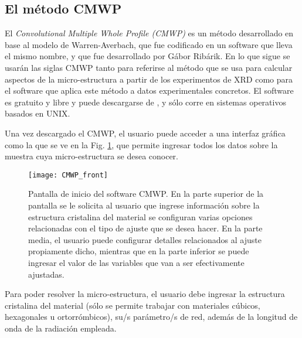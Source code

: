 \subsection{El método CMWP}\label{SS:CMWP}
El \textit{Convolutional Multiple Whole Profile (CMWP)} es un método desarrollado en base al modelo de Warren-Averbach, que fue codificado en un software que lleva el mismo nombre, y que fue desarrollado por Gábor Ribárik\cite{Ungar2001,Ribarik2001,Ribarik2008}. 
En lo que sigue se usarán las siglas CMWP tanto para referirse al método que se usa para calcular aspectos de la micro-estructura a partir de los experimentos de XRD como para el software que aplica este método a datos experimentales concretos.
El software es gratuito y libre y puede descargarse de \cite{cmwp:web}, y sólo corre en sistemas operativos basados en UNIX.

Una vez descargado el CMWP, el usuario puede acceder a una interfaz gráfica como la que se ve en la Fig. \ref{fig:CMWP_front}, que permite ingresar todos los datos sobre la muestra cuya micro-estructura se desea conocer.
\begin{figure}[!htb]
  \centering
  \texttt{[image: CMWP\_front]}
  \caption{Pantalla de inicio del software CMWP. En la parte superior de la pantalla se le solicita al usuario que ingrese información sobre la estructura cristalina del material se configuran varias opciones relacionadas con el tipo de ajuste que se desea hacer. En la parte media, el usuario puede configurar detalles relacionados al ajuste propiamente dicho, mientras que en la parte inferior se puede ingresar el valor de las variables que van a ser efectivamente ajustadas.}
  \label{fig:CMWP_front}
\end{figure}

Para poder resolver la micro-estructura, el usuario debe ingresar la estructura cristalina del material (sólo se permite trabajar con materiales cúbicos, hexagonales u ortorrómbicos), su/s parámetro/s de red, además de la longitud de onda de la radiación empleada.

